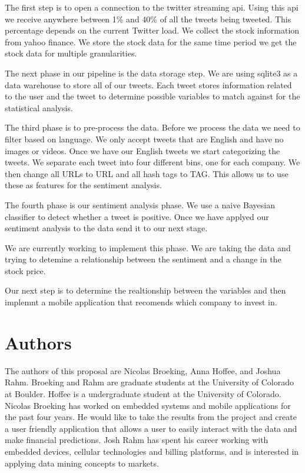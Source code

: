\documentclass{acm_proc_article-sp}
\begin{document}
The first step is to open a connection to the twitter streaming api. Using this
api we receive anywhere between 1\% and 40\% of all the tweets being tweeted.
This percentage depends on the current Twitter load. We collect the stock
information from yahoo finance. We store the stock data for the same time
period we get the stock data for multiple granularities.

The next phase in our pipeline is the data storage step. We are using sqlite3 as
a data warehouse to store all of our tweets. Each tweet stores information
related to the user and the tweet to determine possible variables to match
against for the statistical analysis.

The third phase is to pre-process the data. Before we process the data we need
to filter based on language. We only accept tweets that are English and have no
images or videos. Once we have our English tweets we start categorizing the
tweets. We separate each tweet into four different bins, one for each company.
We then change all URLs to URL and all hash tags to TAG. This allows us to use
these as features for the sentiment analysis. 

The fourth phase is our sentiment analysis phase. We use a naive Bayesian
classifier to detect whether a tweet is positive. Once we have applyed our
sentiment analysis to the data send it to our next stage.

We are currently working to implement this phase. We are taking the data and
trying to detemine a relationship between the sentiment and a change in the
stock price.

Our next step is to determine the realtionship between the variables and then implemnt a mobile application
that recomends which company to invest in. 

\section{Authors}

The authors of this proposal are Nicolas Broeking, Anna
Hoffee, and Joshua Rahm. Broeking and Rahm are graduate students at the
University of Colorado at Boulder. Hoffee is a undergraduate student at the
University of Colorado. Nicolas Broeking has worked on embedded systems and
mobile applications for the past four years. He would like to take the results
from the project and create a user friendly application that allows a user to
easily interact with the data and make financial predictions.  Josh Rahm has
spent his career working with embedded devices, cellular technologies and
billing platforms, and is interested in applying data mining concepts to
markets.  
\end{document}
